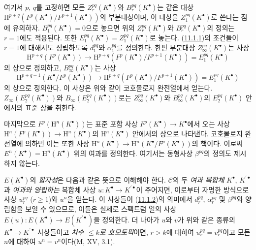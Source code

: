 \begin{env}[11.2.2]
여기서 $p$, $q$를 고정하면 모든 $Z_r^{pq}(K^\bullet)$와
$B_r^{pq}(K^\bullet)$는 같은 대상
$\mathrm H^{p+q}(F^p(K^\bullet)/F^{p+1}(K^\bullet))$의 부분대상이며, 이
대상을 $Z_1^{pq}(K^\bullet)$로 쓴다는 점에 유의하자.
$B_1^{pq}(K^\bullet)=0$으로 놓으면 위의 $Z_r^{pq}(K^\bullet)$와
$B_r^{pq}(K^\bullet)$의 정의는 $r=1$에도 적용된다. 또한
$E_1^{pq}(K^\bullet)=Z_1^{pq}(K^\bullet)$로 놓는다.
(\hyperref[0.11.1.1-fr]{11.1.1})의 조건들이 $r=1$에 대해서도 성립하도록
$d_1^{pq}$와 $\alpha_1^{pq}$를 정의한다. 한편 부분대상
$Z_\infty^{pq}(K^\bullet)$는 사상
\[
  \mathrm H^{p+q}(F^p(K^\bullet))\longrightarrow
  \mathrm H^{p+q}(F^p(K^\bullet)/F^{p+1}(K^\bullet))
  =E_1^{pq}(K^\bullet)
\]
의 상으로 정의하고, $B_\infty^{pq}(K^\bullet)$는 사상
\[
  \mathrm H^{p+q-1}(K^\bullet/F^p(K^\bullet))\longrightarrow
  \mathrm H^{p+q}(F^p(K^\bullet)/F^{p+1}(K^\bullet))
  =E_1^{pq}(K^\bullet)
\]
의 상으로 정의한다. 이 사상은 위와 같이 코호몰로지 완전열에서 얻는다.
$Z_\infty(E_2^{pq}(K^\bullet))$와 $B_\infty(E_2^{pq}(K^\bullet))$로는
$Z_\infty^{pq}(K^\bullet)$와 $B_\infty^{pq}(K^\bullet)$의
$E_2^{pq}(K^\bullet)$ 안에서의 표준 상을 취한다.

마지막으로 $F^p(\mathrm H^n(K^\bullet))$는 표준 포함 사상
$F^p(K^\bullet)\to K^\bullet$에서 오는 사상
$\mathrm H^n(F^p(K^\bullet))\to\mathrm H^n(K^\bullet)$의
$\mathrm H^n(K^\bullet)$ 안에서의 상으로 나타낸다. 코호몰로지 완전열에
의하면 이는 또한 사상
$\mathrm H^n(K^\bullet)\to\mathrm H^n(K^\bullet/F^p(K^\bullet))$의
핵이다. 이로써 $E^n(K^\bullet)=\mathrm H^n(K^\bullet)$ 위의 여과를
정의한다. 여기서는 동형사상 $\beta^{pq}$의 정의도 제시하지 않는다.
\end{env}

\begin{env}[11.2.3]
\label{0.11.2.3-fr}
$E(K^\bullet)$의 \emph{함자성}은 다음과 같은 뜻으로 이해해야 한다.
$\mathcal C$의 두 \emph{여과 복합체} $K^\bullet$,
$K^{\prime\bullet}$과 \emph{여과와 양립하는} 복합체 사상
$u:K^\bullet\to K^{\prime\bullet}$이 주어지면, 이로부터 자명한 방식으로
사상 $u_r^{pq}$ ($r\geq1$)와 $u^n$을 얻는다. 이 사상들이
(\hyperref[0.11.1.2-fr]{11.1.2})의 의미에서 $d_r^{pq}$,
$\alpha_r^{pq}$ 및 $\beta^{pq}$와 양립함을 보일 수 있으므로, 이들은
실제로 스펙트럼 열의 사상
$E(u):E(K^\bullet)\to E(K^{\prime\bullet})$을 정의한다. 더 나아가 $u$와
$v$가 위와 같은 종류의 $K^\bullet\to K^{\prime\bullet}$ 사상들이고
\emph{차수 $\leq k$로 호모토픽}이면, $r>k$에 대하여
$u_r^{pq}=v_r^{pq}$이고 모든 $n$에 대하여 $u^n=v^n$이다(M, XV, 3.1).
\end{env}

